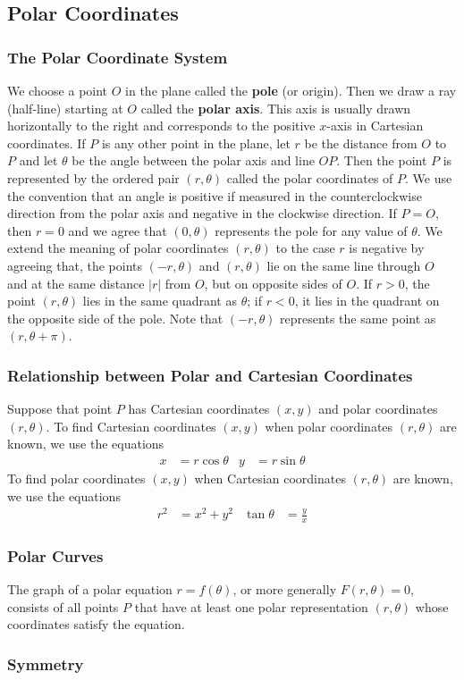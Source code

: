 \subsection{Polar Coordinates}

\subsubsection*{The Polar Coordinate System}
We choose a point \(O\) in the plane called the \textbf{pole} (or origin).
Then we draw a ray (half-line) starting at \(O\) called the
\textbf{polar axis}.
This axis is usually drawn horizontally to the right and
corresponds to the positive \(x\)-axis in Cartesian coordinates.
If \(P\) is any other point in the plane, let \(r\) be the distance from \(O\)
to \(P\) and let \(\theta\) be the angle between the polar axis and line \(OP\).
Then the point \(P\) is represented by the ordered pair \((r,\theta)\) called
the polar coordinates of \(P\).
We use the convention that an angle is positive if measured in the
counterclockwise direction from the polar axis and negative in the clockwise
direction.
If \(P=O\), then \(r=0\) and we agree that \((0,\theta)\) represents the pole
for any value of \(\theta\).
We extend the meaning of polar coordinates \((r,\theta)\) to the case \(r\) is
negative by agreeing that, the points \((-r,\theta)\) and \((r,\theta)\) lie
on the same line through \(O\) and at the same distance \(|r|\) from \(O\),
but on opposite sides of \(O\).
If \(r>0\), the point \((r,\theta)\) lies in the same quadrant as \(\theta\);
if \(r<0\), it lies in the quadrant on the opposite side of the pole.
Note that \((-r,\theta)\) represents the same point as \((r,\theta+\pi)\).

\subsubsection*{Relationship between Polar and Cartesian Coordinates}
Suppose that point \(P\) has Cartesian coordinates \((x,y)\) and polar
coordinates \((r,\theta)\).
To find Cartesian coordinates \((x,y)\) when polar coordinates \((r,\theta)\)
are known, we use the equations
\begin{align*}
    x &= r\cos\theta & y &= r\sin\theta
\end{align*}
To find polar coordinates \((x,y)\) when Cartesian coordinates \((r,\theta)\)
are known, we use the equations
\begin{align*}
    r^2 &= x^2+y^2 & \tan\theta &= \frac{y}{x}
\end{align*}

\subsubsection*{Polar Curves}
The graph of a polar equation \(r=f(\theta)\), or more generally
\(F(r,\theta)=0\), consists of all points \(P\) that have at least one polar
representation \((r,\theta)\) whose coordinates satisfy the equation.

\subsubsection*{Symmetry}